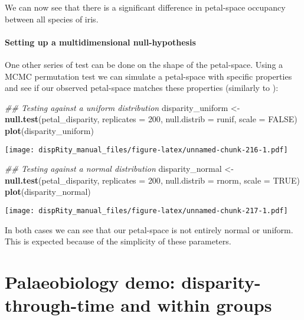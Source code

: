 \documentclass[
]{book}
\newenvironment{Shaded}{\begin{snugshade}}{\end{snugshade}}
\newcommand{\CommentTok}[1]{\textcolor[rgb]{0.56,0.35,0.01}{\textit{#1}}}
\newcommand{\DataTypeTok}[1]{\textcolor[rgb]{0.13,0.29,0.53}{#1}}
\newcommand{\DecValTok}[1]{\textcolor[rgb]{0.00,0.00,0.81}{#1}}
\newcommand{\KeywordTok}[1]{\textcolor[rgb]{0.13,0.29,0.53}{\textbf{#1}}}
\newcommand{\NormalTok}[1]{#1}
\newcommand{\OtherTok}[1]{\textcolor[rgb]{0.56,0.35,0.01}{#1}}
\newcommand{\StringTok}[1]{\textcolor[rgb]{0.31,0.60,0.02}{#1}}
\begin{document}
We can now see that there is a significant difference in petal-space occupancy between all species of iris.

\hypertarget{setting-up-a-multidimensional-null-hypothesis}{%
\subsubsection{Setting up a multidimensional null-hypothesis}\label{setting-up-a-multidimensional-null-hypothesis}}

One other series of test can be done on the shape of the petal-space.
Using a MCMC permutation test we can simulate a petal-space with specific properties and see if our observed petal-space matches these properties (similarly to \citet{diaz2016global}):

\begin{Shaded}
\begin{Highlighting}[]
\CommentTok{\#\# Testing against a uniform distribution}
\NormalTok{disparity\_uniform \textless{}{-}}\StringTok{ }\KeywordTok{null.test}\NormalTok{(petal\_disparity, }\DataTypeTok{replicates =} \DecValTok{200}\NormalTok{,}
    \DataTypeTok{null.distrib =}\NormalTok{ runif, }\DataTypeTok{scale =} \OtherTok{FALSE}\NormalTok{)}
\KeywordTok{plot}\NormalTok{(disparity\_uniform)}
\end{Highlighting}
\end{Shaded}

\texttt{[image: dispRity\_manual\_files/figure-latex/unnamed-chunk-216-1.pdf]}

\begin{Shaded}
\begin{Highlighting}[]
\CommentTok{\#\# Testing against a normal distribution}
\NormalTok{disparity\_normal \textless{}{-}}\StringTok{ }\KeywordTok{null.test}\NormalTok{(petal\_disparity, }\DataTypeTok{replicates =} \DecValTok{200}\NormalTok{,}
    \DataTypeTok{null.distrib =}\NormalTok{ rnorm, }\DataTypeTok{scale =} \OtherTok{TRUE}\NormalTok{)}
\KeywordTok{plot}\NormalTok{(disparity\_normal)}
\end{Highlighting}
\end{Shaded}

\texttt{[image: dispRity\_manual\_files/figure-latex/unnamed-chunk-217-1.pdf]}

In both cases we can see that our petal-space is not entirely normal or uniform.
This is expected because of the simplicity of these parameters.

\hypertarget{palaeobiology-demo-disparity-through-time-and-within-groups}{%
\chapter{Palaeobiology demo: disparity-through-time and within groups}\label{palaeobiology-demo-disparity-through-time-and-within-groups}}
\end{document}
